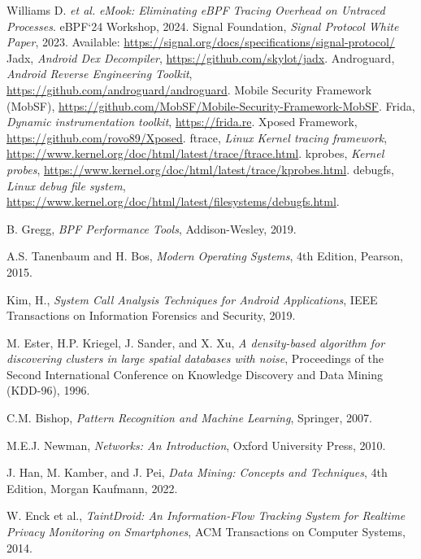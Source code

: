 \documentclass[a4paper,12pt]{report}
\begin{document}
\begin{thebibliography}{99}
     Williams D. \emph{et al.} \emph{eMook: Eliminating eBPF Tracing Overhead on Untraced Processes}. eBPF‘24 Workshop, 2024.
     Signal Foundation, \textit{Signal Protocol White Paper}, 2023. Available: \url{https://signal.org/docs/specifications/signal-protocol/}
 Jadx, \textit{Android Dex Decompiler}, \url{https://github.com/skylot/jadx}.
 Androguard, \textit{Android Reverse Engineering Toolkit}, \url{https://github.com/androguard/androguard}.
 Mobile Security Framework (MobSF), \url{https://github.com/MobSF/Mobile-Security-Framework-MobSF}.
 Frida, \textit{Dynamic instrumentation toolkit}, \url{https://frida.re}.
 Xposed Framework, \url{https://github.com/rovo89/Xposed}.
 ftrace, \textit{Linux Kernel tracing framework}, \url{https://www.kernel.org/doc/html/latest/trace/ftrace.html}.
 kprobes, \textit{Kernel probes}, \url{https://www.kernel.org/doc/html/latest/trace/kprobes.html}.
 debugfs, \textit{Linux debug file system}, \url{https://www.kernel.org/doc/html/latest/filesystems/debugfs.html}.

B. Gregg, \textit{BPF Performance Tools}, Addison-Wesley, 2019.

A.S. Tanenbaum and H. Bos, \textit{Modern Operating Systems}, 4th Edition, Pearson, 2015.

Kim, H., \textit{System Call Analysis Techniques for Android Applications}, IEEE Transactions on Information Forensics and Security, 2019.

M. Ester, H.P. Kriegel, J. Sander, and X. Xu, \textit{A density-based algorithm for discovering clusters in large spatial databases with noise}, Proceedings of the Second International Conference on Knowledge Discovery and Data Mining (KDD-96), 1996.

C.M. Bishop, \textit{Pattern Recognition and Machine Learning}, Springer, 2007.

M.E.J. Newman, \textit{Networks: An Introduction}, Oxford University Press, 2010.

J. Han, M. Kamber, and J. Pei, \textit{Data Mining: Concepts and Techniques}, 4th Edition, Morgan Kaufmann, 2022.

W. Enck et al., \textit{TaintDroid: An Information-Flow Tracking System for Realtime Privacy Monitoring on Smartphones}, ACM Transactions on Computer Systems, 2014.


\end{thebibliography}
\end{document}
